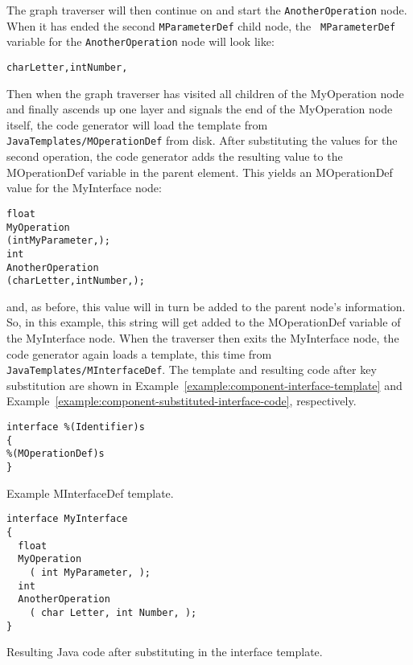 The graph traverser will then continue on and start the {\tt AnotherOperation}
node. When it has ended the second {\tt MParameterDef} child node, the {\tt
MParameterDef} variable for the {\tt AnotherOperation} node will look like:
\begin{small}
\begin{alltt}
char{\textvisiblespace}Letter,{\textvisiblespace}int{\textvisiblespace}Number,\textvisiblespace
\end{alltt}
\end{small}
Then when the graph traverser has visited all children of the MyOperation node
and finally ascends up one layer and signals the end of the MyOperation node
itself, the code generator will load the template from {\tt
JavaTemplates/MOperationDef} from disk. After substituting the values for the
second operation, the code generator adds the resulting value to the
MOperationDef variable in the parent element. This yields an MOperationDef value
for the MyInterface node:
\begin{small}
\begin{alltt}
  float
  MyOperation
    ( int MyParameter, );
  int
  AnotherOperation
    ( char Letter, int Number, );
\end{alltt}
\end{small}
and, as before, this value will in turn be added to the parent node's
information. So, in this example, this string will get added to the
MOperationDef variable of the MyInterface node. When the traverser then exits
the MyInterface node, the code generator again loads a template, this time from
{\tt JavaTemplates/MInterfaceDef}. The template and resulting code after key
substitution are shown in Example~\ref{example:component-interface-template} and
Example~\ref{example:component-substituted-interface-code}, respectively.

\begin{Example}
\begin{minifbox}
\begin{small}
\begin{verbatim}
interface %(Identifier)s
{
%(MOperationDef)s
}
\end{verbatim}
\end{small}
\end{minifbox}
\caption{Example MInterfaceDef template.}
\label{example:component-interface-template}
\end{Example}

\begin{Example}
\begin{minifbox}
\begin{small}
\begin{verbatim}
interface MyInterface
{
  float
  MyOperation
    ( int MyParameter, );
  int
  AnotherOperation
    ( char Letter, int Number, );
}
\end{verbatim}
\end{small}
\end{minifbox}
\caption{Resulting Java code after substituting in the interface template.}
\label{example:component-substituted-interface-code}
\end{Example}

